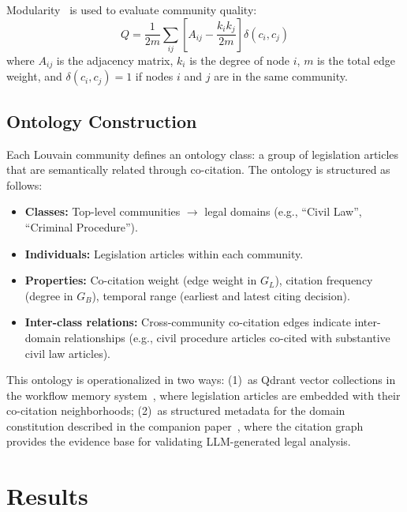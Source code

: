 \documentclass[11pt]{article}
\begin{document}
Modularity~\citep{newman2004modularity} is used to evaluate community quality:
\begin{equation}
  Q = \frac{1}{2m} \sum_{ij} \left[ A_{ij} - \frac{k_i k_j}{2m} \right] \delta(c_i, c_j)
\end{equation}
where $A_{ij}$ is the adjacency matrix, $k_i$ is the degree of node $i$, $m$ is the total edge weight, and $\delta(c_i, c_j) = 1$ if nodes $i$ and $j$ are in the same community.

\subsection{Ontology Construction}
\label{sec:ontology}

Each Louvain community defines an ontology class: a group of legislation articles that are semantically related through co-citation.
The ontology is structured as follows:

\begin{itemize}[leftmargin=*, nosep]
  \item \textbf{Classes:} Top-level communities $\to$ legal domains (e.g., ``Civil Law'', ``Criminal Procedure'').
  \item \textbf{Individuals:} Legislation articles within each community.
  \item \textbf{Properties:} Co-citation weight (edge weight in $G_L$), citation frequency (degree in $G_B$), temporal range (earliest and latest citing decision).
  \item \textbf{Inter-class relations:} Cross-community co-citation edges indicate inter-domain relationships (e.g., civil procedure articles co-cited with substantive civil law articles).
\end{itemize}

This ontology is operationalized in two ways:
(1)~as Qdrant vector collections in the workflow memory system~\citep{ovcharov2026workflowmemory}, where legislation articles are embedded with their co-citation neighborhoods;
(2)~as structured metadata for the domain constitution described in the companion paper~\citep{ovcharov2026bridge}, where the citation graph provides the evidence base for validating LLM-generated legal analysis.


\section{Results}
\label{sec:results}
\end{document}

